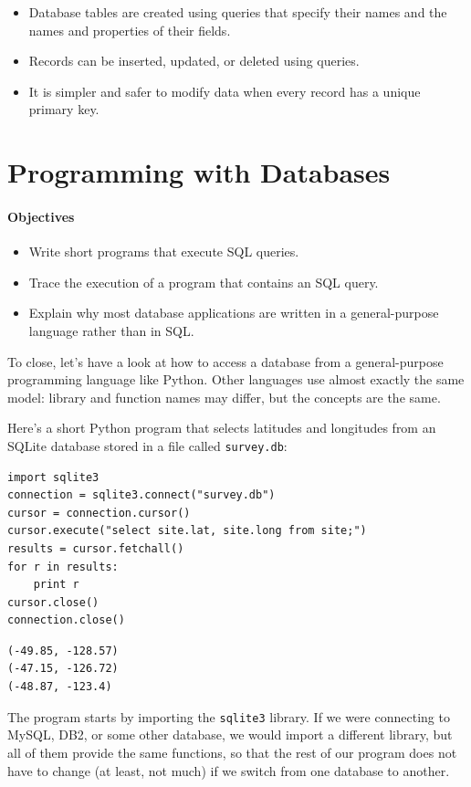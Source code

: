 \documentclass[]{book}
\begin{document}
\begin{itemize}
\item
  Database tables are created using queries that specify their names and
  the names and properties of their fields.
\item
  Records can be inserted, updated, or deleted using queries.
\item
  It is simpler and safer to modify data when every record has a unique
  primary key.
\end{itemize}

\section{Programming with Databases}

\mbox{}\paragraph{Objectives}

\begin{itemize}
\item
  Write short programs that execute SQL queries.
\item
  Trace the execution of a program that contains an SQL query.
\item
  Explain why most database applications are written in a
  general-purpose language rather than in SQL.
\end{itemize}

To close, let's have a look at how to access a database from a
general-purpose programming language like Python. Other languages use
almost exactly the same model: library and function names may differ,
but the concepts are the same.

Here's a short Python program that selects latitudes and longitudes from
an SQLite database stored in a file called \texttt{survey.db}:

\begin{verbatim}
import sqlite3
connection = sqlite3.connect("survey.db")
cursor = connection.cursor()
cursor.execute("select site.lat, site.long from site;")
results = cursor.fetchall()
for r in results:
    print r
cursor.close()
connection.close()
\end{verbatim}

\begin{verbatim}
(-49.85, -128.57)
(-47.15, -126.72)
(-48.87, -123.4)
\end{verbatim}

The program starts by importing the \texttt{sqlite3} library. If we were
connecting to MySQL, DB2, or some other database, we would import a
different library, but all of them provide the same functions, so that
the rest of our program does not have to change (at least, not much) if
we switch from one database to another.
\end{document}
